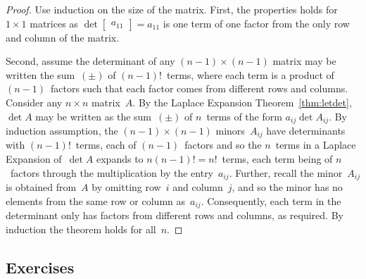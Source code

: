 \begin{proof} 
Use induction on the size of the matrix.
First, the properties holds for \(1\times 1\) matrices as \(\det\begin{bmatrix} a_{11} \end{bmatrix}=a_{11}\) is one term of one factor from the only row and column of the matrix.

Second, assume the determinant of any \((n-1)\times (n-1)\) matrix may be written the sum~\((\pm)\) of \((n-1)!\)~terms, where each term is a product of \((n-1)\)~factors such that each factor comes from different rows and columns.
Consider any \(n\times n\) matrix~\(A\).
By the Laplace Expansion Theorem~\ref{thm:letdet}, \(\det A\) may be written as the sum~\((\pm)\) of \(n\)~terms of the form \(a_{ij}\det A_{ij}\).
By induction assumption, the \((n-1)\times(n-1)\) minors~\(A_{ij}\) have determinants with \((n-1)!\)~terms, each of \((n-1)\)~factors and so the \(n\)~terms in a Laplace Expansion of~\(\det A\) expands to \(n(n-1)!=n!\)~terms, each term being of \(n\)~factors through the multiplication by the entry~\(a_{ij}\).
Further, recall the minor~\(A_{ij}\) is obtained from~\(A\) by omitting row~\(i\) and column~\(j\), and so the minor has no elements from the same row or column as~\(a_{ij}\).
Consequently, each term in the determinant only has factors from different rows and columns, as required.
By induction the theorem holds for all~\(n\).
\end{proof}





\begin{comment}
\nakos{} has an interesting section on using determinants to fit some interesting curves, and other determinant uses: such material could go here.
\end{comment}






\subsection{Exercises}




